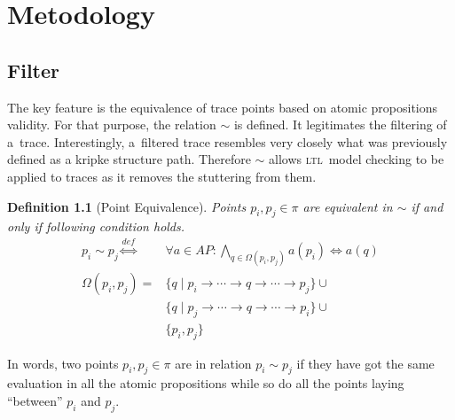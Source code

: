 \documentclass[12pt,oneside,draft]{fithesis}
\newcommand{\ltl}{\textsc{ltl}~}
\newtheorem{mydef}{Definition}
\begin{document}
\chapter{Metodology}
\section{Filter}
The key feature is the equivalence of trace points based on atomic
propositions validity. For that purpose, the relation $\sim$ is defined.
It legitimates the filtering of a~trace. Interestingly,
a~filtered trace resembles very closely what was previously defined as
a kripke structure path. Therefore $\sim$ allows \ltl model checking
to be applied to traces as it removes the stuttering from
them\cite{lamport}.
\begin{mydef}[Point Equivalence]
Points $p_i,p_j\in\pi$ are equivalent in $\sim$ if and only if following
condition holds.
\begin{align}
	p_i\sim p_j	\overset{def}{\iff}&\forall a\in AP:
		\bigwedge_{q\in\Omega(p_i,p_j)}a(p_i)\iff a(q)\\
\Omega(p_i,p_j)=&\{q\mid p_i\rightarrow\dotsm\rightarrow q
		\rightarrow\dotsm\rightarrow p_j\}\cup\nonumber\\
		&\{q\mid p_j\rightarrow\dotsm\rightarrow q\rightarrow\dotsm
		\rightarrow p_i\}\cup\nonumber\\
		&\{p_i,p_j\}
\end{align}
\end{mydef}
In words, two points $p_i,p_j\in\pi$ are in relation $p_i\sim p_j$ if
they have got the same evaluation in all the atomic propositions while
so do all the points laying ``between'' $p_i$ and $p_j$.
\end{document}
